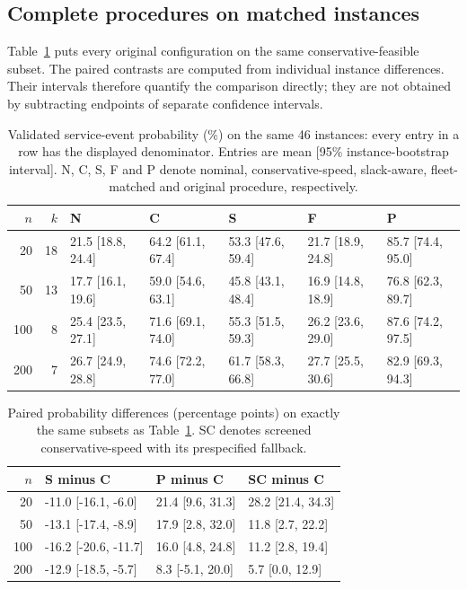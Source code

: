 \subsection{Complete procedures on matched instances}

Table~\ref{tab:matched} puts every original configuration on the same conservative-feasible subset. The paired contrasts are computed from individual instance differences. Their intervals therefore quantify the comparison directly; they are not obtained by subtracting endpoints of separate confidence intervals.

\begin{table}[htbp]
\centering
\scriptsize
\caption{Validated service-event probability (\%) on the same 46 instances: every entry in a row has the displayed denominator. Entries are mean [95\% instance-bootstrap interval]. N, C, S, F and P denote nominal, conservative-speed, slack-aware, fleet-matched and original procedure, respectively.}
\label{tab:matched}
\begin{tabular}{rrlllll}
\toprule
$n$ & $k$ & N & C & S & F & P\\
\midrule
20 & 18 & 21.5 [18.8, 24.4] & 64.2 [61.1, 67.4] & 53.3 [47.6, 59.4] & 21.7 [18.9, 24.8] & 85.7 [74.4, 95.0]\\
50 & 13 & 17.7 [16.1, 19.6] & 59.0 [54.6, 63.1] & 45.8 [43.1, 48.4] & 16.9 [14.8, 18.9] & 76.8 [62.3, 89.7]\\
100 & 8 & 25.4 [23.5, 27.1] & 71.6 [69.1, 74.0] & 55.3 [51.5, 59.3] & 26.2 [23.6, 29.0] & 87.6 [74.2, 97.5]\\
200 & 7 & 26.7 [24.9, 28.8] & 74.6 [72.2, 77.0] & 61.7 [58.3, 66.8] & 27.7 [25.5, 30.6] & 82.9 [69.3, 94.3]\\
\bottomrule
\end{tabular}
\end{table}


\begin{table}[htbp]
\centering
\small
\caption{Paired probability differences (percentage points) on exactly the same subsets as Table~\ref{tab:matched}. SC denotes screened conservative-speed with its prespecified fallback.}
\label{tab:paired}
\begin{tabular}{rlll}
\toprule
$n$ & S minus C & P minus C & SC minus C\\
\midrule
20 & -11.0 [-16.1, -6.0] & 21.4 [9.6, 31.3] & 28.2 [21.4, 34.3]\\
50 & -13.1 [-17.4, -8.9] & 17.9 [2.8, 32.0] & 11.8 [2.7, 22.2]\\
100 & -16.2 [-20.6, -11.7] & 16.0 [4.8, 24.8] & 11.2 [2.8, 19.4]\\
200 & -12.9 [-18.5, -5.7] & 8.3 [-5.1, 20.0] & 5.7 [0.0, 12.9]\\
\bottomrule
\end{tabular}
\end{table}



